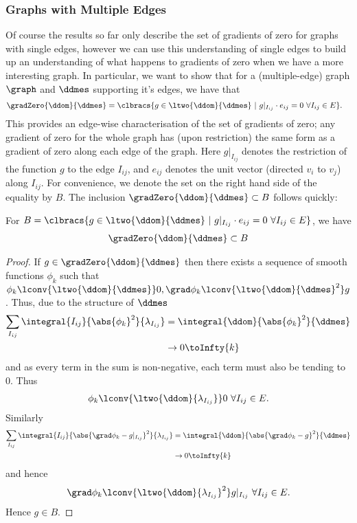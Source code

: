 \subsubsection{Graphs with Multiple Edges}
Of course the results so far only describe the set of gradients of zero for graphs with single edges, however we can use this understanding of single edges to build up an understanding of what happens to gradients of zero when we have a more interesting graph.
In particular, we want to show that for a (multiple-edge) graph $\graph$ and $\ddmes$ supporting it's edges, we have that
\begin{align*}
	\gradZero{\ddom}{\ddmes} &= \clbracs{g\in\ltwo{\ddom}{\ddmes} \ \vert \ g\vert_{I_{ij}}\cdot e_{ij}=0 \ \forall I_{ij}\in E}.
\end{align*}
This provides an edge-wise characterisation of the set of gradients of zero; any gradient of zero for the whole graph has (upon restriction) the same form as a gradient of zero along each edge of the graph.
Here $g\vert_{I_{ij}}$ denotes the restriction of the function $g$ to the edge $I_{ij}$, and $e_{ij}$ denotes the unit vector (directed $v_i$ to $v_j$) along $I_{ij}$.
For convenience, we denote the set on the right hand side of the equality by $B$.
The inclusion $\gradZero{\ddom}{\ddmes} \subset B$ follows quickly:
\begin{prop} \label{prop:Grad0IncB}
	For $B=\clbracs{g\in\ltwo{\ddom}{\ddmes} \ \vert \ g\vert_{I_{ij}}\cdot e_{ij}=0 \ \forall I_{ij}\in E}$, we have
	\begin{align*}
		\gradZero{\ddom}{\ddmes}\subset B
	\end{align*}
\end{prop}
\begin{proof}
	If $g\in\gradZero{\ddom}{\ddmes}$ then there exists a sequence of smooth functions $\phi_k$ such that $\phi_k\lconv{\ltwo{\ddom}{\ddmes}}0, \grad\phi_k\lconv{\ltwo{\ddom}{\ddmes}^2}g$.
	Thus, due to the structure of $\ddmes$
	\begin{align*}
		\sum_{I_{ij}}\integral{I_{ij}}{\abs{\phi_k}^2}{\lambda_{I_{ij}}} &= \integral{\ddom}{\abs{\phi_k}^2}{\ddmes} \\
		&\rightarrow 0 \toInfty{k}
	\end{align*}
	and as every term in the sum is non-negative, each term must also be tending to 0.
	Thus 
	\begin{align*}
		\phi_k\lconv{\ltwo{\ddom}{\lambda_{I_{ij}}}}0 \ \forall I_{ij}\in E.
	\end{align*}
	Similarly
	\begin{align*}
		\sum_{I_{ij}}\integral{I_{ij}}{\abs{\grad\phi_k - g\vert_{I_{ij}}}^2}{\lambda_{I_{ij}}} &= \integral{\ddom}{\abs{\grad\phi_k - g}^2}{\ddmes} \\
		&\rightarrow 0 \toInfty{k}
	\end{align*}	
	and hence 
	\begin{align*}
		\grad\phi_k\lconv{\ltwo{\ddom}{\lambda_{I_{ij}}}^2} g\vert_{I_{ij}} \ \forall I_{ij}\in E.
	\end{align*}
	Hence $g\in B$.
\end{proof}

